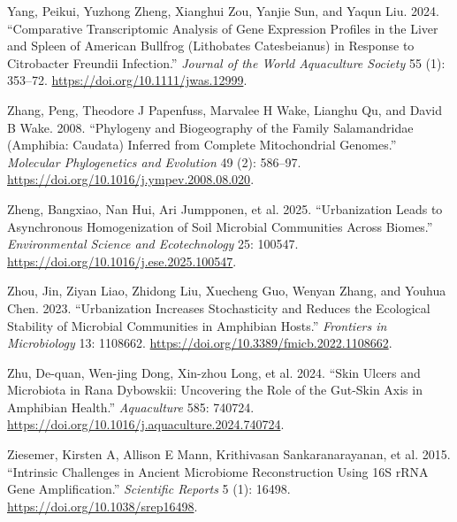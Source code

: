 \documentclass[
  12pt,
]{article}
\newlength{\cslhangindent}
\newenvironment{CSLReferences}[2] %
 {\begin{list}{}{%
  \setlength{\itemindent}{0pt}
  \setlength{\leftmargin}{0pt}
  \setlength{\parsep}{0pt}
  \ifodd #1
   \setlength{\leftmargin}{\cslhangindent}
   \setlength{\itemindent}{-1\cslhangindent}
  \fi
  \setlength{\itemsep}{#2\baselineskip}}}
 {\end{list}}
\begin{document}
\begin{CSLReferences}{1}{1}
Yang, Peikui, Yuzhong Zheng, Xianghui Zou, Yanjie Sun, and Yaqun Liu.
2024. {``Comparative Transcriptomic Analysis of Gene Expression Profiles
in the Liver and Spleen of {American} Bullfrog ({Lithobates}
Catesbeianus) in Response to {Citrobacter} Freundii Infection.''}
\emph{Journal of the World Aquaculture Society} 55 (1): 353--72.
\url{https://doi.org/10.1111/jwas.12999}.

Zhang, Peng, Theodore J Papenfuss, Marvalee H Wake, Lianghu Qu, and
David B Wake. 2008. {``Phylogeny and Biogeography of the Family
{Salamandridae} ({Amphibia}: {Caudata}) Inferred from Complete
Mitochondrial Genomes.''} \emph{Molecular Phylogenetics and Evolution}
49 (2): 586--97. \url{https://doi.org/10.1016/j.ympev.2008.08.020}.

Zheng, Bangxiao, Nan Hui, Ari Jumpponen, et al. 2025. {``Urbanization
Leads to Asynchronous Homogenization of Soil Microbial Communities
Across Biomes.''} \emph{Environmental Science and Ecotechnology} 25:
100547. \url{https://doi.org/10.1016/j.ese.2025.100547}.

Zhou, Jin, Ziyan Liao, Zhidong Liu, Xuecheng Guo, Wenyan Zhang, and
Youhua Chen. 2023. {``Urbanization Increases Stochasticity and Reduces
the Ecological Stability of Microbial Communities in Amphibian Hosts.''}
\emph{Frontiers in Microbiology} 13: 1108662.
\url{https://doi.org/10.3389/fmicb.2022.1108662}.

Zhu, De-quan, Wen-jing Dong, Xin-zhou Long, et al. 2024. {``Skin Ulcers
and Microbiota in {Rana} Dybowskii: Uncovering the Role of the Gut-Skin
Axis in Amphibian Health.''} \emph{Aquaculture} 585: 740724.
\url{https://doi.org/10.1016/j.aquaculture.2024.740724}.

{Ziesemer, Kirsten A, Allison E Mann, Krithivasan Sankaranarayanan, et
al.} 2015. {``Intrinsic Challenges in Ancient Microbiome Reconstruction
Using {16S} {rRNA} Gene Amplification.''} \emph{Scientific Reports} 5
(1): 16498. \url{https://doi.org/10.1038/srep16498}.

\end{CSLReferences}
\end{document}
